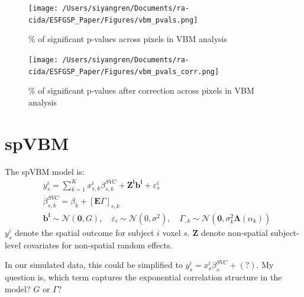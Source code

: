 \documentclass[12pt]{article}
\begin{document}
\begin{figure}[H]
    \centering
    \begin{minipage}[b]{0.45\textwidth}
        \texttt{[image: /Users/siyangren/Documents/ra-cida/ESFGSP\_Paper/Figures/vbm\_pvals.png]}
        \caption{\% of significant p-values across pixels in VBM analysis}
        \label{fig:vbm_pvals}
    \end{minipage}
    \hfill %
    \begin{minipage}[b]{0.45\textwidth}
        \texttt{[image: /Users/siyangren/Documents/ra-cida/ESFGSP\_Paper/Figures/vbm\_pvals\_corr.png]}
        \caption{\% of significant p-values after correction across pixels in VBM analysis}
        \label{fig:vbm_pvals_corr}
    \end{minipage}
\end{figure}


\section*{spVBM}

The spVBM model is:
\[
    \begin{aligned}
         & y_s^i=\sum_{k=1}^K x_{s, k}^i \beta_{s, k}^{S V C}+\mathbf{Z}^{\mathbf{i}} \mathbf{b}^{\mathbf{i}}+\varepsilon_s^i                                                                                                                      \\
         & \beta_{s, k}^{S V C}=\beta_k+[\mathbf{E} \Gamma]_{s, k}                                                                                                                                                                                 \\
         & \mathbf{b}^{\mathbf{i}} \sim \mathcal{N}(\mathbf{0}, G), \quad \varepsilon_i \sim \mathcal{N}\left(0, \sigma^2\right), \quad \Gamma_{, k} \sim \mathcal{N}\left(\mathbf{0}, \sigma_k^2 \boldsymbol{\Lambda}\left(\alpha_k\right)\right)
    \end{aligned}
\]
\(y_s^i\) denote the spatial outcome for subject \(i\) voxel \(s\). \(\mathbf{Z}\) denote non-spatial subject-level covariates for non-spatial random effects.

In our simulated data, this could be simplified to \(y_s^i = x_s^i \beta_s^{SVC} + (?) \). My question is, which term captures the exponential correlation structure in the model? \(G\) or \(\Gamma\)?
\end{document}
